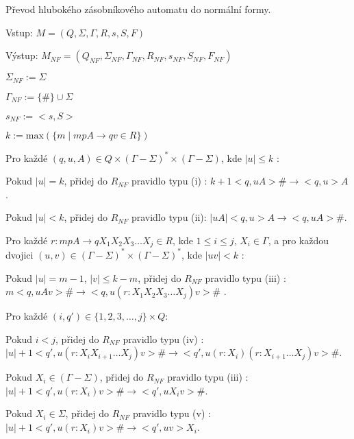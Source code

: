 \begin{Alg}
Převod hlubokého zásobníkového automatu do normální formy.

\begin{list}{}{\setlength\parsep{0cm} \setlength\itemsep{0cm} \setlength\leftmargin{1em}}
   \item Vstup: $M = (Q,\Sigma,\Gamma, R, s, S, F)$ 
   \item Výstup: $M_{NF} = (Q_{NF}, \Sigma_{NF}, {\Gamma}_{NF}, R_{NF}, s_{NF},  S_{NF}, F_{NF})$ \medskip
  
  \item \label{r1} ${\Sigma}_{NF} := \Sigma$
  \item ${\Gamma}_{NF} :=\{\#\} \cup \Sigma$
  \item $s_{NF} := <s,S>$
  \item $k := \mathrm{max}(\{m \mid mpA \rightarrow qv \in R\}) $ \medskip

  \item Pro každé $(q,u,A) \in Q \times (\Gamma - \Sigma)^* \times (\Gamma - \Sigma)$, kde $|u| \le k$ : \medskip

  \subitem Pokud $|u| = k$, přidej do $R_{NF}$ pravidlo typu (i) :
  \subitem $k+1 <q,uA> \# \rightarrow <q,u> A$. \medskip

  \subitem Pokud $|u| < k$, přidej do $R_{NF}$ pravidlo typu (ii):
  \subitem $|uA| <q,u> A \rightarrow <q,uA> \#$. \medskip

  \item Pro každé $r : mpA \rightarrow q X_1 X_2 X_3 \dots X_j \in R$, kde $1 \le i \le j$, $X_i \in \Gamma$, a 
        pro každou dvojici $(u,v) \in (\Gamma - \Sigma)^* \times (\Gamma - \Sigma)^*$, kde $|uv| < k$ : \medskip

  \subitem Pokud $|u| = m - 1$, $|v| \le k-m$, přidej do $R_{NF}$ pravidlo typu (iii) :
  \subitem $m <q,uAv> \# \rightarrow <q,u (r : X_1 X_2 X_3 \dots X_j) v>\#$ . \medskip

  \subitem Pro každé $(i,q') \in \{1,2,3,\dots,j\} \times Q$: \medskip

  \subsubitem Pokud $i < j$, přidej do $R_{NF}$ pravidlo typu (iv) :
  \subsubitem $|u|+1 <q',u(r : X_i X_{i+1} \dots X_j)v> \# \rightarrow <q',u(r : X_i) (r: X_{i+1} \dots X_j)v> \# $. \medskip

  \subsubitem Pokud $X_i \in (\Gamma - \Sigma)$, přidej do $R_{NF}$ pravidlo typu (iii) :
  \subsubitem $|u|+1 <q',u (r : X_i) v> \# \rightarrow <q',u X_i v> \# $. \medskip

  \subsubitem Pokud $X_i \in \Sigma$, přidej do $R_{NF}$ pravidlo typu (v) :
  \subsubitem $|u|+1 <q',u (r : X_i) v> \# \rightarrow <q',uv> X_i $. \medskip


\end{list}
\end{Alg}


